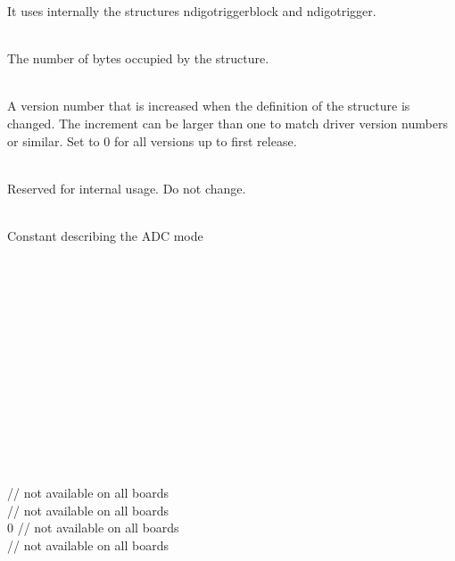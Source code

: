             It uses internally the structures \textsf{ndigo\tu trigger\tu block} and \textsf{ndigo\tu trigger}.\par

            \\
            The number of bytes occupied by the structure.\par

            \\
            A version number that is increased when the definition of the structure is changed. The increment can be larger than one to match driver version numbers or similar. Set to 0 for all versions up to first release.\par

            \\
            Reserved for internal usage. Do not change.\par

            \\
            Constant describing the ADC mode\par

            \\
            \\
            \\
            \\
            \\
            \\
            \\
            \\
            \\
            \\
            \\
            \\
            \\
             // not available on all boards\\
             // not available on all boards\\
            0 // not available on all boards\\
             // not available on all boards\par

